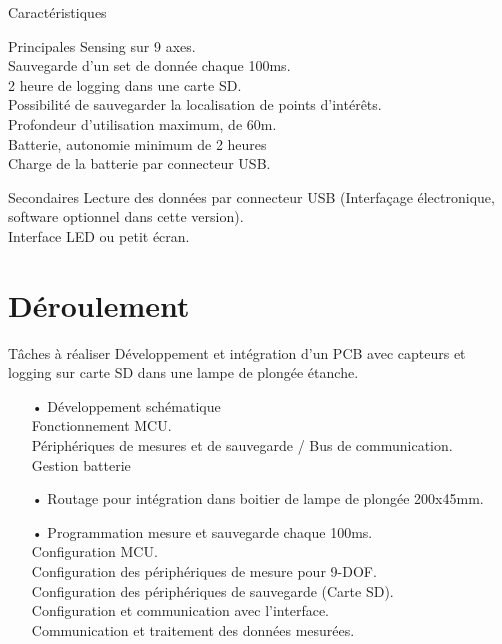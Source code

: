 \documentclass[compress,aspectratio=169]{beamer}
\begin{document}
\begin{frame}{Caractéristiques}
	\begin{alertblock}{Principales}
		Sensing sur 9 axes. \\
		Sauvegarde d’un set de donnée chaque 100ms.\\
		2 heure de logging dans une carte SD. \\
		Possibilité de sauvegarder la localisation de points d’intérêts. \\
		Profondeur d’utilisation maximum, de 60m. \\ 
		Batterie, autonomie minimum de 2 heures \\
		Charge de la batterie par connecteur USB.
	\end{alertblock}
	\begin{exampleblock}{Secondaires}
		Lecture des données par connecteur USB (Interfaçage électronique, software
		optionnel dans cette version). \\
		Interface LED ou petit écran.
	\end{exampleblock}
\end{frame}

\section{Déroulement}

\begin{frame}[containsverbatim]{Tâches à réaliser}
	Développement et intégration d’un PCB avec capteurs et logging sur carte SD dans une lampe de plongée étanche.
	\begin{itemize}
		\item[•] Développement schématique 
		\\ \quad Fonctionnement MCU. 
		\\ \quad Périphériques de mesures et de sauvegarde / Bus de communication. 
		\\ \quad Gestion batterie 
		\item[•]	Routage pour intégration dans boitier de lampe de plongée 200x45mm.
		\item[•]	Programmation mesure et sauvegarde chaque 100ms.
		\\	\quad Configuration MCU.
		\\	\quad Configuration des périphériques de mesure pour 9-DOF.
		\\	\quad Configuration des périphériques de sauvegarde (Carte SD).
		\\	\quad Configuration et communication avec l'interface.
		\\	\quad Communication et traitement des données mesurées.
	\end{itemize}
\end{frame}
\end{document}

